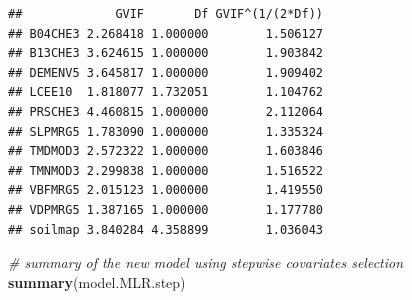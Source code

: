 \documentclass[10pt,b5paper,]{book}
\newenvironment{Shaded}{\begin{snugshade}}{\end{snugshade}}
\newcommand{\CommentTok}[1]{\textcolor[rgb]{0.56,0.35,0.01}{\textit{#1}}}
\newcommand{\KeywordTok}[1]{\textcolor[rgb]{0.13,0.29,0.53}{\textbf{#1}}}
\newcommand{\NormalTok}[1]{#1}
\theoremstyle{definition}
\theoremstyle{definition}
\theoremstyle{definition}
\theoremstyle{remark}
\begin{document}
\begin{verbatim}
##             GVIF       Df GVIF^(1/(2*Df))
## B04CHE3 2.268418 1.000000        1.506127
## B13CHE3 3.624615 1.000000        1.903842
## DEMENV5 3.645817 1.000000        1.909402
## LCEE10  1.818077 1.732051        1.104762
## PRSCHE3 4.460815 1.000000        2.112064
## SLPMRG5 1.783090 1.000000        1.335324
## TMDMOD3 2.572322 1.000000        1.603846
## TMNMOD3 2.299838 1.000000        1.516522
## VBFMRG5 2.015123 1.000000        1.419550
## VDPMRG5 1.387165 1.000000        1.177780
## soilmap 3.840284 4.358899        1.036043
\end{verbatim}

\begin{Shaded}
\begin{Highlighting}[]
\CommentTok{# summary  of the new model using stepwise covariates selection}
\KeywordTok{summary}\NormalTok{(model.MLR.step)}
\end{Highlighting}
\end{Shaded}
\end{document}

